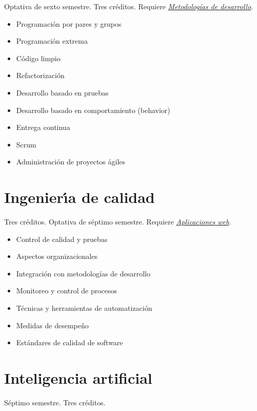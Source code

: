\documentclass{article}
\begin{document}
\begin{multicols}{4}
Optativa de sexto semestre. Tres cr\'{e}ditos. Requiere
\hyperlink{mdd}{\em Metodolog\'{i}as de desarrollo}.

\begin{itemize}
\item{Programaci\'{o}n por pares y grupos}
\item{Programaci\'{o}n extrema}
\item{C\'{o}digo limpio}
\item{Refactorizaci\'{o}n}
  \item{Desarrollo basado en pruebas}
\item{Desarrollo basado en comportamiento (behavior)}
\item{Entrega continua}
\item{Scrum}
\item{Administraci\'{o}n de proyectos \'{a}giles}
\end{itemize}

\vfill\null \columnbreak

\hypertarget{idc}{\section*{Ingenier\'{\i}a de calidad}} 

Tres cr\'{e}ditos. Optativa de s\'{e}ptimo semestre. Requiere
\hyperlink{aw}{\em Aplicaciones web}.

\begin{itemize}
\item{Control de calidad y pruebas}
\item{Aspectos organizacionales}
\item{Integraci\'{o}n con metodolog\'{i}as de desarrollo}
\item{Monitoreo y control de procesos}
\item{T\'{e}cnicas y herramientas de automatizaci\'{o}n}
\item{Medidas de desempe\~{n}o}
\item{Est\'{a}ndares de calidad de software}
\end{itemize}

\newpage

\hypertarget{ia}{\section*{Inteligencia artificial}}

S\'{e}ptimo semestre. Tres cr\'{e}ditos.


\end{multicols}
\end{document}
